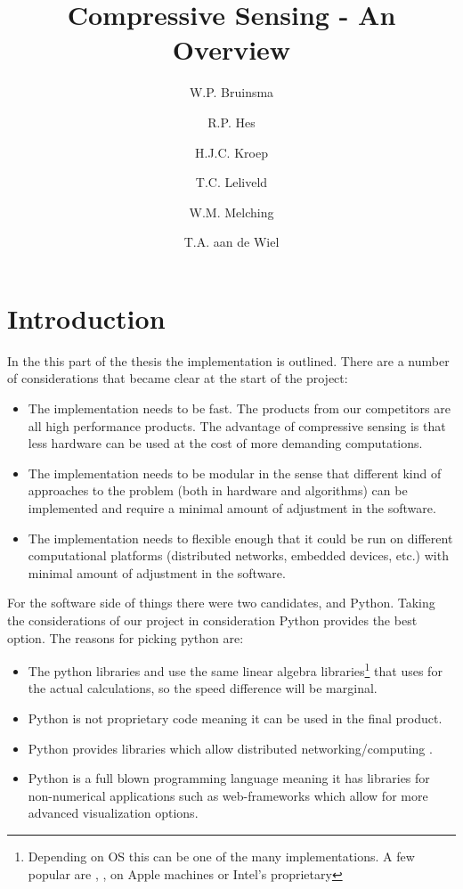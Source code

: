 \documentclass[a4paper, openany, oneside]{memoir}
\title{Compressive Sensing - An Overview}
\author{W.P. Bruinsma \and R.P. Hes \and H.J.C. Kroep \and T.C. Leliveld \and W.M. Melching \and T.A. aan de Wiel}
\begin{document}
\chapter{Introduction}
In the this part of the thesis the implementation is outlined. There are a number of considerations that became clear at the start of the project:
\begin{itemize}
    \item The implementation needs to be fast. The products from our competitors are all high performance products. The advantage of compressive sensing is that less hardware can be used at the cost of more demanding computations.
    \item The implementation needs to be modular in the sense that different kind of approaches to the problem (both in hardware and algorithms) can be implemented and require a minimal amount of adjustment in the software.
    \item The implementation needs to flexible enough that it could be run on different computational platforms (distributed networks, embedded devices, etc.) with minimal amount of adjustment in the software.
\end{itemize}
For the software side of things there were two candidates, \matlab{} and Python. Taking the considerations of our project in consideration Python provides the best option. The reasons for picking python are:
\begin{itemize}
    \item The python libraries  and  use the same linear algebra libraries\footnote{Depending on OS this can be one of the many implementations. A few popular are , ,  on Apple machines or Intel's proprietary } that \matlab{} uses for the actual calculations, so the speed difference will be marginal.
    \item Python is not proprietary code meaning it can be used in the final product.
    \item Python provides libraries which allow distributed networking/computing \cite{pythonmp}.
    \item Python is a full blown programming language meaning it has libraries for non-numerical applications such as web-frameworks which allow for more advanced visualization options.
\end{itemize}
\end{document}
